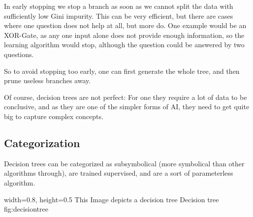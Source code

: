 In early stopping we stop a branch as soon as we cannot split the data with sufficiently low Gini impurity. This can be very efficient, but there are cases where one question does not help at all, but more do. One example would be an XOR-Gate, as any one input alone does not provide enough information, so the learning algorithm would stop, although the question could be answered by two questions. %

So to avoid stopping too early, one can first generate the whole tree, and then prune useless branches away.

Of course, decision trees are not perfect: For one they require a lot of data to be conclusive, and as they are one of the simpler forms of AI, they need to get quite big to capture complex concepts.

\subsection{Categorization}
Decision trees can be categorized as subsymbolical (more symbolical than other algorithms through), are trained supervised, and are a sort of parameterless algorithm.

    {width=0.8\textwidth, height=0.5\textheight} %
    {This Image depicts a decision tree}   %
    {Decision tree}   %
    {fig:decisiontree}    %

 